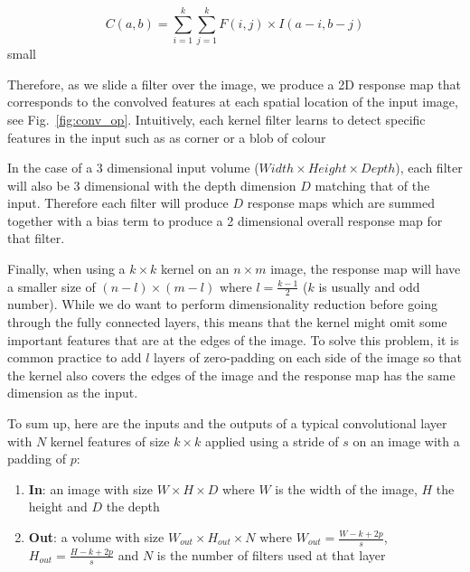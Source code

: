 \documentclass[12pt,twoside]{article}
\begin{document}
\begin{equation}
  C(a,b) = \sum_{i=1}^{k}\sum_{j=1}^{k} F(i,j) \times I(a-i, b-j)
  \label{eq:convolution}
\end{equation}small

Therefore, as we slide a filter over the image, we produce a 2D response map
that corresponds to the convolved features at each spatial location of the
input image, see Fig.~\ref{fig:conv_op}. Intuitively, each kernel filter learns
to detect specific features in the input such as as corner or a blob of colour

In the case of a 3 dimensional input volume ($Width \times Height \times Depth$), each filter will also be 3
dimensional with the depth dimension $D$ matching that of the input. Therefore each
filter will produce $D$ response maps which are summed together with a bias
term to produce a 2 dimensional overall response map for that filter.

Finally, when using a $k\times k$ kernel on an $n \times m$ image, the response map will have a smaller
size of $(n-l)\times(m-l)$ where $l=\frac{k-1}{2}$ ($k$ is usually and odd
number). While we do want to perform dimensionality reduction before going
through the fully connected layers, this means that the kernel might omit some
important features that are at the edges of the image. To solve this problem,
it is common practice to add $l$ layers of zero-padding on each side of the
image so that the kernel also covers the edges of the image and the response
map has the same dimension as the input.

To sum up, here are the inputs and the outputs of a typical convolutional
layer with $N$ kernel features of size $k \times k$ applied using a stride of
$s$ on an image with a padding of $p$:

\begin{enumerate}
  \item \textbf{In}: an image with size $W \times H \times D$ where $W$ is the
    width of the image, $H$ the height and $D$ the depth
  \item \textbf{Out}: a volume with size $W_{out} \times H_{out} \times N$
    where $W_{out} = \frac{W - k + 2p}{s}$, $H_{out} = \frac{H- k + 2p}{s}$ and
    $N$ is the number of filters used at that layer
\end{enumerate}
\end{document}
